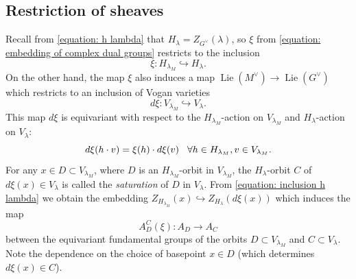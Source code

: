\documentclass[11pt,letterpaper]{amsart}
\newcommand{\dualgroup}[1]{{#1}^\vee}
\renewcommand{\1}{\mathbbm{1}}
\numberwithin{equation}{section}
\begin{document}
{\subsection{Restriction of sheaves}\label{subsec: restriction of sheaves}

Recall from \eqref{equation: h lambda} that $H_\lambda=Z_{\dualgroup{G}}(\lambda)$, so  $\xi$ from \eqref{equation: embedding of complex dual groups} restricts to the inclusion
\begin{equation}\label{equation: inclusion h lambda}
    \xi: H_{\lambda_M} \hookrightarrow H_\lambda.
\end{equation}
On the other hand, the map $\xi$ also induces a map $\operatorname{Lie}(\dualgroup{M})\to \operatorname{Lie}(\dualgroup{G})$ which restricts to an inclusion of Vogan varieties
\begin{equation}\label{equation: inclusion of vogan varieties}
    d\xi: V_{\lambda_M} \hookrightarrow{} V_\lambda.
\end{equation}
This map $d\xi$ is equivariant with respect to the $H_{\lambda_M}$-action on $V_{\lambda_M}$ and $H_\lambda$-action on $V_\lambda$:
\[d\xi(h\cdot v)=\xi(h)\cdot d\xi(v) \hspace{0.3cm} \forall h\in H_{\lambda_M}, v\in V_{\lambda_M}.\]
For any $x \in D \subset V_{\lambda_M}$, where $D$ is an $H_{\lambda_M}$-orbit in $V_{\lambda_M}$, the $H_\lambda$-orbit $C$ of $d\xi(x)\in V_\lambda$ is called the \emph{saturation} of $D$ in $V_\lambda$. From \eqref{equation: inclusion h lambda} we obtain the embedding $Z_{H_{\lambda_M}}(x) \hookrightarrow Z_{H_\lambda}(d\xi(x))$ which induces the map
\begin{equation}\label{equation: map of fundamental groups}
    A_D^C(\xi): A_D \to A_C
\end{equation}
between the equivariant fundamental groups of the orbits $D \subset V_{\lambda_M}$ and $C\subset V_\lambda$. Note the dependence on the choice of basepoint $x\in D$ (which determines $d\xi(x)\in C$). 

}
\end{document}
